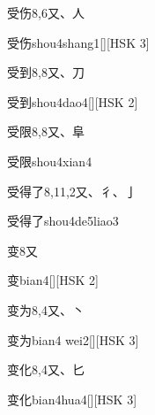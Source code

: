 \begin{entry}{受伤}{8,6}{⼜、⼈}
  \begin{phonetics}{受伤}{shou4shang1}[][HSK 3]
  \end{phonetics}
\end{entry}

\begin{entry}{受到}{8,8}{⼜、⼑}
  \begin{phonetics}{受到}{shou4dao4}[][HSK 2]
  \end{phonetics}
\end{entry}

\begin{entry}{受限}{8,8}{⼜、⾩}
  \begin{phonetics}{受限}{shou4xian4}
  \end{phonetics}
\end{entry}

\begin{entry}{受得了}{8,11,2}{⼜、⼻、⼅}
  \begin{phonetics}{受得了}{shou4de5liao3}
  \end{phonetics}
\end{entry}

\begin{entry}{变}{8}{⼜}
  \begin{phonetics}{变}{bian4}[][HSK 2]
  \end{phonetics}
\end{entry}

\begin{entry}{变为}{8,4}{⼜、⼂}
  \begin{phonetics}{变为}{bian4 wei2}[][HSK 3]
  \end{phonetics}
\end{entry}

\begin{entry}{变化}{8,4}{⼜、⼔}
  \begin{phonetics}{变化}{bian4hua4}[][HSK 3]
  \end{phonetics}
\end{entry}

